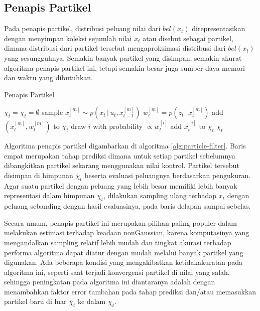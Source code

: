 \subsection{Penapis Partikel}

Pada penapis partikel, distribusi peluang nilai dari $bel(x_t)$ direpresentasikan dengan menyimpan koleksi sejumlah nilai $x_t$ atau disebut sebagai partikel, dimana distribusi dari partikel tersebut mengaproksimasi distribusi dari $bel(x_t)$ yang sesungguhnya. Semakin banyak partikel yang disimpan, semakin akurat algoritma penapis partikel ini, tetapi semakin besar juga sumber daya memori dan waktu yang dibutuhkan.

\begin{algorithm}
    \caption{Penapis Partikel}
    \label{alg:particle-filter}
    \begin{algorithmic}[1]
        \State $\overline{\chi}_t= \overline{\chi}_t = \emptyset$
        \State sample $x_t^{[m]} \sim p(x_t \,|\, u_t, x_{t-1}^{[m]})$
        \State $w_t^{[m]} = p(z_t \,|\, x_t^{[m]})$
        \State add $(x_t^{[m]}, w_t^{[m]})$ to $\overline{\chi}_t$
        \EndFor
        \State draw $i$ with probability $\propto w_t^{[i]}$
        \State add $x_t^{[i]}$ to $\chi_t$
        \EndFor
        \State \Return $\chi_t$
        \EndFunction
    \end{algorithmic}
\end{algorithm}

Algoritma penapis partikel digambarkan di algoritma \ref{alg:particle-filter}. Baris empat merupakan tahap prediksi dimana untuk setiap partikel sebelumnya dibangkitkan partikel sekarang menggunakan nilai kontrol. Partikel tersebut disimpan di himpunan $\overline{\chi}_t$ beserta evaluasi peluangnya berdasarkan pengukuran. Agar suatu partikel dengan peluang yang lebih besar memiliki lebih banyak representasi dalam himpunan $\chi_t$, dilakukan sampling ulang terhadap $x_t$ dengan peluang sebanding dengan hasil evaluasinya, pada baris delapan sampai sebelas.

Secara umum, penapis partikel ini merupakan pilihan paling populer dalam melakukan estimasi terhadap keadaan nonGaussian, karena komputasinya yang mengandalkan sampling relatif lebih mudah dan tingkat akurasi terhadap performa algoritma dapat diatur dengan mudah melalui banyak partikel yang digunakan. Ada beberapa kondisi yang mengakibatkan ketidakakuratan pada algoritma ini, seperti saat terjadi konvergensi partikel di nilai yang salah, sehingga peningkatan pada algoritma ini diantaranya adalah dengan menambahkan faktor error tambahan pada tahap prediksi dan/atau memasukkan partikel baru di luar $\overline{\chi}_t$ ke dalam $\chi_t$.


